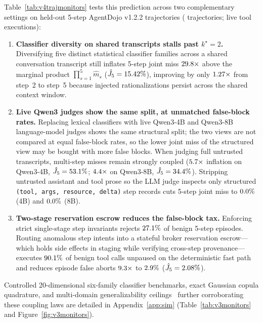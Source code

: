 Table~\ref{tab:v4trajmonitors} tests this prediction across two complementary settings on held-out 5-step AgentDojo v1.2.2 trajectories (\VFourTrajEvalCount{} trajectories; \VFourTrajToolCalls{} live tool executions):
\begin{enumerate}
  \item \textbf{Classifier diversity on shared transcripts stalls past \(k^\star = 2\).} Diversifying five distinct statistical classifier families across a shared conversation transcript still inflates 5-step joint miss \(29.8\times\) above the marginal product \(\prod_{s=1}^5 \hat{m}_s\) (\(\hat{J}_5 = 15.42\%\)), improving by only \(1.27\times\) from step~2 to step~5 because injected rationalizations persist across the shared context window.
  \item \textbf{Live Qwen3 judges show the same split, at unmatched false-block rates.} Replacing lexical classifiers with live Qwen3-4B and Qwen3-8B language-model judges shows the same structural split; the two views are not compared at equal false-block rates, so the lower joint miss of the structured view may be bought with more false blocks. When judging full untrusted transcripts, multi-step misses remain strongly coupled (\(5.7\times\) inflation on Qwen3-4B, \(\hat{J}_5 = 53.1\%\); \(4.4\times\) on Qwen3-8B, \(\hat{J}_5 = 34.4\%\)). Stripping untrusted assistant and tool prose so the LLM judge inspects only structured \texttt{(tool, args, resource, delta)} step records cuts 5-step joint miss to \(0.0\%\) (4B) and \(0.0\%\) (8B).
  \item \textbf{Two-stage reservation escrow reduces the false-block tax.} Enforcing strict single-stage step invariants rejects \(27.1\%\) of benign 5-step episodes. Routing anomalous step intents into a stateful broker reservation escrow---which holds side effects in staging while verifying cross-step provenance---executes \(90.1\%\) of benign tool calls unpaused on the deterministic fast path and reduces episode false aborts \(9.3\times\) to \(2.9\%\) (\(\hat{J}_5 = 2.08\%\)).
\end{enumerate}

Controlled 20-dimensional six-family classifier benchmarks, exact Gaussian copula quadrature, and multi-domain generalizability ceilings~\cite{cronbach} further corroborating these coupling laws are detailed in Appendix~\ref{app:sim} (Table~\ref{tab:v3monitors} and Figure~\ref{fig:v3monitors}).
